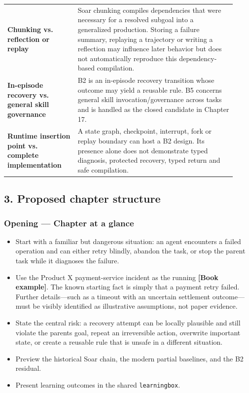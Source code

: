 \begin{longtable}[]{@{}>{\raggedright\arraybackslash}p{0.29\linewidth}>{\raggedright\arraybackslash}p{0.63\linewidth}@{}}
\textbf{Chunking vs. reflection or replay} & Soar chunking compiles dependencies that were necessary for a resolved subgoal into a generalized production. Storing a failure summary, replaying a trajectory or writing a reflection may influence later behavior but does not automatically reproduce this dependency-based compilation. \\
\textbf{In-episode recovery vs. general skill governance} & B2 is an in-episode recovery transition whose outcome may yield a reusable rule. B5 concerns general skill invocation/governance across tasks and is handled as the closed candidate in Chapter 17. \\
\textbf{Runtime insertion point vs. complete implementation} & A state graph, checkpoint, interrupt, fork or replay boundary can host a B2 design. Its presence alone does not demonstrate typed diagnosis, protected recovery, typed return and safe compilation. \\
\end{longtable}

\subsection{3. Proposed chapter structure}\label{3-proposed-chapter-structure}

\subsubsection{Opening --- Chapter at a glance}\label{opening--chapter-at-a-glance}

\begin{itemize}
\tightlist
\item
  Start with a familiar but dangerous situation: an agent encounters a failed operation and can either retry blindly, abandon the task, or stop the parent task while it diagnoses the failure.
\item
  Use the Product X payment-service incident as the running \textbf{{[}Book example{]}}. The known starting fact is simply that a payment retry failed. Further details---such as a timeout with an uncertain settlement outcome---must be visibly identified as illustrative assumptions, not paper evidence.
\item
  State the central risk: a recovery attempt can be locally plausible and still violate the parent\textquotesingle s goal, repeat an irreversible action, overwrite important state, or create a reusable rule that is unsafe in a different situation.
\item
  Preview the historical Soar chain, the modern partial baselines, and the B2 residual.
\item
  Present learning outcomes in the shared \texttt{learningbox}.
\end{itemize}

